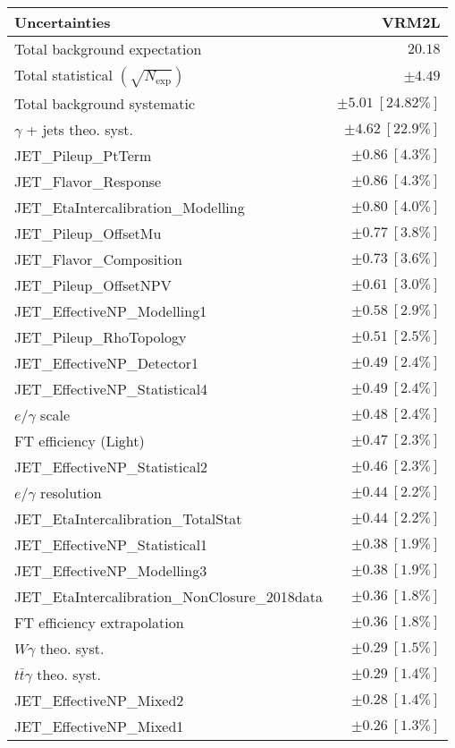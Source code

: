 \begin{tabular}{lr}
\hline
\textbf{Uncertainties} & \textbf{VRM2L} \\
\hline
Total background expectation & $20.18$ \\
\hline
Total statistical $(\sqrt{N_\mathrm{exp}})$ & $\pm 4.49$ \\
Total background systematic & $\pm 5.01\ [24.82\%]$ \\
\hline
\hline
$\gamma$ + jets theo. syst. & $\pm 4.62\ [22.9\%]$ \\
JET\_Pileup\_PtTerm & $\pm 0.86\ [4.3\%]$ \\
JET\_Flavor\_Response & $\pm 0.86\ [4.3\%]$ \\
JET\_EtaIntercalibration\_Modelling & $\pm 0.80\ [4.0\%]$ \\
JET\_Pileup\_OffsetMu & $\pm 0.77\ [3.8\%]$ \\
JET\_Flavor\_Composition & $\pm 0.73\ [3.6\%]$ \\
JET\_Pileup\_OffsetNPV & $\pm 0.61\ [3.0\%]$ \\
JET\_EffectiveNP\_Modelling1 & $\pm 0.58\ [2.9\%]$ \\
JET\_Pileup\_RhoTopology & $\pm 0.51\ [2.5\%]$ \\
JET\_EffectiveNP\_Detector1 & $\pm 0.49\ [2.4\%]$ \\
JET\_EffectiveNP\_Statistical4 & $\pm 0.49\ [2.4\%]$ \\
$e/\gamma$ scale & $\pm 0.48\ [2.4\%]$ \\
FT efficiency (Light) & $\pm 0.47\ [2.3\%]$ \\
JET\_EffectiveNP\_Statistical2 & $\pm 0.46\ [2.3\%]$ \\
$e/\gamma$ resolution & $\pm 0.44\ [2.2\%]$ \\
JET\_EtaIntercalibration\_TotalStat & $\pm 0.44\ [2.2\%]$ \\
JET\_EffectiveNP\_Statistical1 & $\pm 0.38\ [1.9\%]$ \\
JET\_EffectiveNP\_Modelling3 & $\pm 0.38\ [1.9\%]$ \\
JET\_EtaIntercalibration\_NonClosure\_2018data & $\pm 0.36\ [1.8\%]$ \\
FT efficiency extrapolation & $\pm 0.36\ [1.8\%]$ \\
$W\gamma$ theo. syst. & $\pm 0.29\ [1.5\%]$ \\
$t\bar{t}\gamma$ theo. syst. & $\pm 0.29\ [1.4\%]$ \\
JET\_EffectiveNP\_Mixed2 & $\pm 0.28\ [1.4\%]$ \\
JET\_EffectiveNP\_Mixed1 & $\pm 0.26\ [1.3\%]$ \\

\end{tabular}

